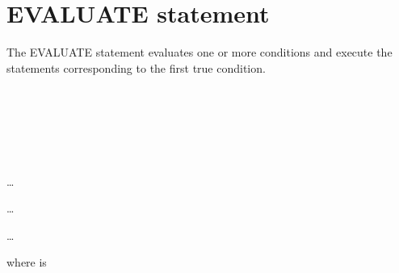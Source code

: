 \section{EVALUATE statement}

The EVALUATE statement evaluates one or more conditions and execute the statements corresponding to the first true condition.

\begin{syntax}
  \begin{1=}
    \expression \\
     \\
  \end{1=}
  \begin{0-1}
    \begin{1=}
      \expression \\
       \\
    \end{1=}
  \end{0-1} \ldots

  \begin{1=}
    \begin{0-1}
       
    \end{0-1}\ldots\ {}
    \imperativestatement
  \end{1=} \ldots

  \begin{0-1}
      \imperativestatement
  \end{0-1}

  \begin{0-1}
  \end{0-1}
\end{syntax}

where  is

\begin{syntax}
  \begin{1=}
    \begin{0-1}
      \begin{1=}
         \\
      \end{1=}
      \expression
    \end{0-1} \\

     \\
     \\
  \end{1=}
\end{syntax}

